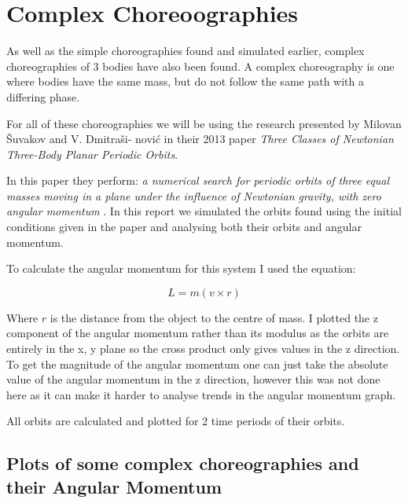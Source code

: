 \documentclass[11pt]{article}
\begin{document}
\centering
\section{Complex Choreoographies}
\raggedright


As well as the simple choreographies found and simulated earlier, complex choreographies of 3 bodies have also been found. A complex choreography is one where bodies have the same mass, but do not follow the same path with a differing phase.
\smallskip

For all of these choreographies we will be using the research presented by Milovan \v{S}uvakov and V. Dmitra\v{s}i- novi\'{c} in their 2013 paper \textit{Three Classes of Newtonian Three-Body Planar Periodic Orbits}. \cite{ComplexNbody}

\smallskip

In this paper they perform: \textit{a numerical search for periodic orbits of three equal masses moving in a plane under the influence of Newtonian gravity, with zero angular momentum} \cite{ComplexNbody}. 
In this report we simulated the orbits found using the initial conditions given in the paper and analysing both their orbits and angular momentum.



To calculate the angular momentum for this system I used the equation:

$$L = m (v \times r)$$

Where $r$ is the distance from the object to the centre of mass. I plotted the z component of the angular momentum rather than its modulus as the orbits are entirely in the x, y plane so the cross product only gives values in the z direction. To get the magnitude of the angular momentum one can just take the absolute value of the angular momentum in the z direction, however this was not done here as it can make it harder to analyse trends in the angular momentum graph.

All orbits are calculated and plotted for 2 time periods of their orbits.

\centering
\subsection{Plots of some complex choreographies and their Angular Momentum}
\end{document}
